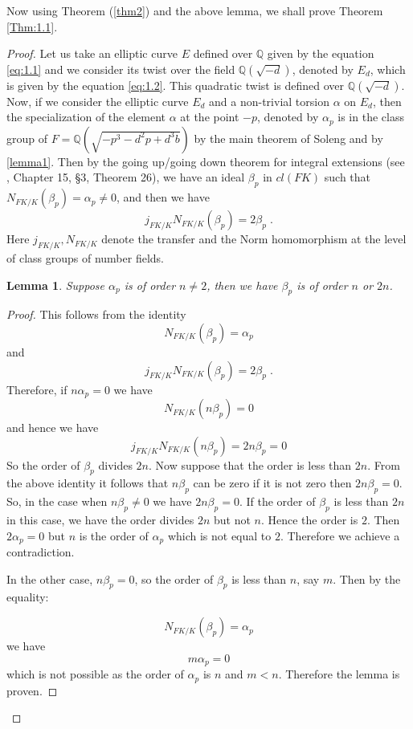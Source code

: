 \documentclass[12pt, 14paper]{amsart}
\theoremstyle{plain}
\newtheorem{lemma}[subsection]{Lemma}
\numberwithin{equation}{section}
\newcommand \QQ {{\mathbb Q}}
\begin{document}
Now using Theorem (\ref{thm2}) and the above lemma, we shall prove Theorem \eqref{Thm:1.1}.


\begin{proof}
Let us take an elliptic curve $E$ defined over $\QQ$ given by the equation \eqref{eq:1.1}
and we consider its twist over the field $\QQ(\sqrt{-d})$, denoted by $E_d$, which is given by the equation \eqref{eq:1.2}.
This quadratic twist is defined over $\QQ(\sqrt{-d})$.
Now, if we consider the elliptic curve $E_d$ and a non-trivial torsion $\alpha$ on $E_d$, then the specialization of the element $\alpha$ at the point $-p$, denoted by $\alpha_p$ is in the class group of $F=\QQ(\sqrt{-p^3-d^2p+d^3b})$ by the main theorem of Soleng \cite{S} and by \ref{lemma1}. Then by the going up/going down theorem for integral extensions (see \cite{DF07}, Chapter 15, \S 3, Theorem 26), we have an ideal $\beta_p$ in $cl(FK)$ such that $N_{FK/K}(\beta_p)=\alpha_p\neq 0$, and then we have 
$$j_{FK/K}N_{FK/K}(\beta_p)=2\beta_p\;.$$
Here $j_{FK/K},N_{FK/K}$ denote the transfer and the Norm homomorphism at the level of class groups of number fields.


\begin{lemma}
Suppose $\alpha_p$ is of order $n\neq 2$, then we have $\beta_p $ is of order $n$ or $2n$.
\end{lemma}

\begin{proof}
This follows from the identity
$$N_{FK/K}(\beta_p)=\alpha_p$$
and 
$$j_{FK/K}N_{FK/K}(\beta_p)=2\beta_p\;.$$
Therefore, if $n\alpha_p=0$ we have 
$$N_{FK/K}(n\beta_p)=0$$
and hence we have 
$$j_{FK/K}N_{FK/K}(n\beta_p)=2n\beta_p=0$$
So the order of $\beta_p$ divides $2n$. Now suppose that the order is less than $2n$. From the above identity it follows that $n\beta_p$ can be zero if it is not zero then $2n\beta_p=0$. So, in the case when $n\beta_p\neq 0$ we have $2n\beta_p=0$. If the order of $\beta_p$ is less than $2n$ in this case, we have the order divides $2n$ but not $n$. Hence the order is $2$. Then $2\alpha_p=0$ but $n$ is the order of $\alpha_p$ which is not equal to $2$. Therefore we achieve a contradiction. 

In the other case, $n\beta_p=0$, so the order of $\beta_p$ is less than $n$, say $m$. Then by the equality:

$$N_{FK/K}(\beta_p)=\alpha_p$$
we have
$$m\alpha_p=0$$
which is not possible as the order of $\alpha_p$ is $n$ and $m<n$. Therefore the lemma is proven.


\end{proof}

\end{proof}
\end{document}
